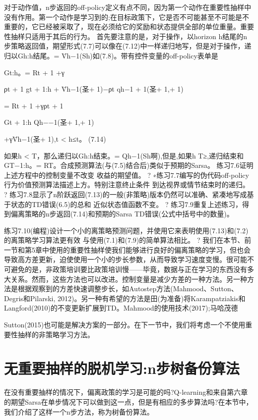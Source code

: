 对于动作值，n步返回的off-policy定义有点不同，因为第一个动作在重要性抽样中没有作用。第一个动作是学习到的;在目标政策下，它是否不可能甚至不可能是不重要的，它已经被采取了，现在必须给它的奖励和状态提供全部的单位重量。重要性抽样只适用于其后的行为。
首先要注意的是，对于操作，以horizon h结尾的n步策略返回值，期望形式(7.7)可以像在(7.12)中一样递归地写，但是对于操作，递归以Gh:h结尾。= V̄h−1(Sh)如(7.8)。带有控件变量的off-policy表单是

Gt:h。= Rt + 1 +γ

ρt + 1 gt + 1:h + V̄h−1(圣+ 1)−ρt qh−1 + 1(圣+ 1,+ 1)

= Rt + 1 +γρt + 1

Gt + 1:h Qh−−1(圣+ 1,+ 1)

+γV̄h−1(圣+ 1),t < h≤t。
(7.14)

如果h < T，那么递归以Gh:h结束。= Qh−1(Sh啊),但是,如果h T≥,递归结束和GT−1:h。= RT。合成预测算法(与(7.5)结合后)类似于预期的Sarsa。
练习7.6证明上述方程中的控制变量不改变
收益的期望值。 					?
∗练习7.7编写的伪代码off-policy行为价值预测算法描述上方。特别注意终止条件
到达视界或情节结束时的递归。 					?
练习7.8显示了n阶跃返回(7.13)的一般(非策略)版本仍然可以准确、紧凑地写成基于状态的TD错误(6.5)的总和
近似状态值函数不变。 					?
练习7.9重复上述练习，得到偏离策略的n步返回(7.14)和预期的Sarsa TD错误(公式中括号中的数量)。


练习7.10(编程)设计一个小的离策略预测问题，并使用它来表明使用(7.13)和(7.2)的离策略学习算法更有效
与使用(7.1)和(7.9)的简单算法相比。 					?
我们在本节、前一节和第5章中使用的重要性抽样使我们能够进行良好的偏离策略的学习，但也会导致高方差更新，迫使使用一个小的步长参数，从而导致学习速度变慢。很可能不可避免的是，非政策培训要比政策培训慢——毕竟，数据与正在学习的东西没有多大关系。然而，这些方法也可以改进。控制变量是减少方差的一种方法。另一种方法是根据观察到的方差快速调整步长，如Autostep方法(Mahmood、Sutton、Degris和Pilarski, 2012)。另一种有希望的方法是田(为准备)将Karampatziakis和Langford(2010)的不变更新扩展到TD。Mahmood的使用技术(2017);马哈茂德

Sutton(2015)也可能是解决方案的一部分。在下一节中，我们将考虑一个不使用重要性抽样的非策略学习方法。


\section{无重要抽样的脱机学习:n步树备份算法}

在没有重要抽样的情况下，偏离政策的学习是可能的吗?Q-learning和来自第六章的期望Sarsa在单步情况下可以做到这一点，但是有相应的多步算法吗?在本节中，我们介绍了这样一个n步方法，称为树备份算法。

